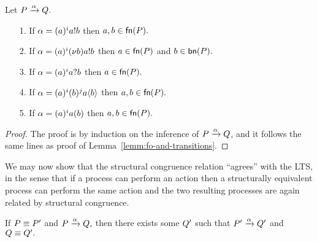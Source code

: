 \begin{lemma}{\label{lemm:free_names}}
Let $P\xrightarrow{\alpha}Q.$
\begin{itemize}
\item[1.] If $\alpha=(a)^ia!b$ then $a,b\in\mathsf{fn}(P).$
\item[2.] If $\alpha={(a)^i(\nu b)}a!b$ then $a\in\mathsf{fn}(P)$ and $b\in\mathsf{bn}(P).$
\item[3.] If $\alpha=(a)^ia?b$ then $a\in\mathsf{fn}(P).$
\item[4.] If $\alpha=(a)^i(b)^ja\langle b\rangle$ then $a,b\in\mathsf{fn}(P).$
\item[5.] If $\alpha=(a)^ia(b)$ then $a,b\in\mathsf{fn}(P).$
\end{itemize}
\end{lemma}
\begin{proof}
The proof is by induction on the inference of $P\xrightarrow{\alpha}Q$, and it follows the same lines as proof of Lemma~\ref{lemm:fo-and-transitions}.
\end{proof}

We may now show that the structural congruence relation ``agrees'' with the LTS, in the sense that if a process can perform an action then a structurally equivalent process can perform the same action and the two resulting processes are again related by structural congruence.

\begin{lemma} {\label{lemm:lts_struct_congruence}}
If $P\equiv P'$ and $P\xrightarrow{\alpha}Q,$ then there exists some $Q'$ such that $P'\xrightarrow{\alpha}Q'$ and $Q\equiv Q'.$
\end{lemma}

